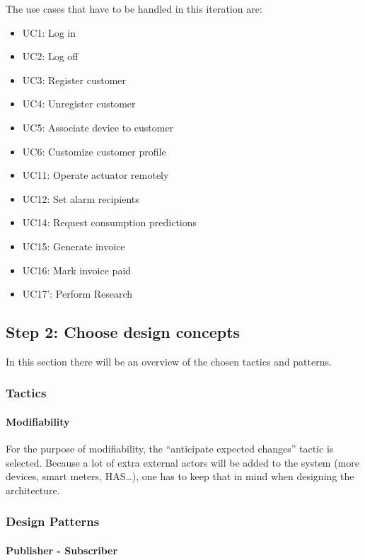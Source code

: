 \npar The use cases that have to be handled in this iteration are:

\begin{itemize}
	\item UC1: Log in
	\item UC2: Log off
	\item UC3: Register customer
	\item UC4: Unregister customer
	\item UC5: Associate device to customer
	\item UC6: Customize customer profile
	\item UC11: Operate actuator remotely
	\item UC12: Set alarm recipients
	\item UC14: Request consumption predictions
	\item UC15: Generate invoice
	\item UC16: Mark invoice paid
	\item UC17': Perform Research
\end{itemize}

\subsection{Step 2: Choose design concepts}
\label{add:it10/concepts}

\npar In this section there will be an overview of the chosen tactics and
patterns.

\subsubsection{Tactics}
\label{add:it10/tactics}

\paragraph{Modifiability}

\npar For the purpose of modifiability, the ``anticipate expected changes'' tactic
is selected. Because a lot of extra external actors will be added to the
system (more devices, smart meters, HAS\ldots), one has to keep that in mind
when designing the architecture. 

\subsubsection{Design Patterns}
\label{add:it10/patterns}

\paragraph{Publisher - Subscriber}

